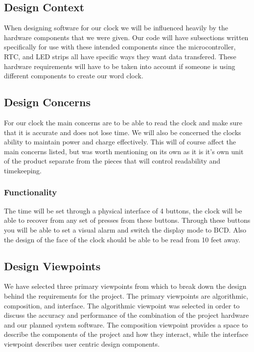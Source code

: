 \documentclass[onecolumn, draftclsnofoot,10pt, compsoc]{IEEEtran}
\begin{document}
\newpage

\subsection{Design Context}
When designing software for our clock we will be influenced heavily by the hardware components that we were given.
Our code will have subsections written specifically for use with these intended components since the microcontroller, RTC, and LED strips all have specific ways they want data transfered.
These hardware requirements will have to be taken into account if someone is using different components to create our word clock.

\subsection{Design Concerns}

For our clock the main concerns are to be able to read the clock and make sure that it is accurate and does not lose time.
We will also be concerned the clocks ability to maintain power and charge effectively.
This will of course affect the main concerns listed, but was worth mentioning on its own as it is it's own unit of the product separate from the pieces that will control readability and timekeeping.

\subsubsection{Functionality}
The time will be set through a physical interface of 4 buttons, the clock will be able to recover from any set of presses from these buttons.
Through these buttons you will be able to set a visual alarm and switch the display mode to BCD.
Also the design of the face of the clock should be able to be read from 10 feet away.

\subsection{Design Viewpoints}

We have selected three primary viewpoints from which to break down the design behind the requirements for the project.
The primary viewpoints are algorithmic, composition, and interface.
The algorithmic viewpoint was selected in order to discuss the accuracy and performance of the combination of the project hardware and our planned system software.
The composition viewpoint provides a space to describe the components of the project and how they interact, while the interface viewpoint describes user centric design components.
\end{document}

